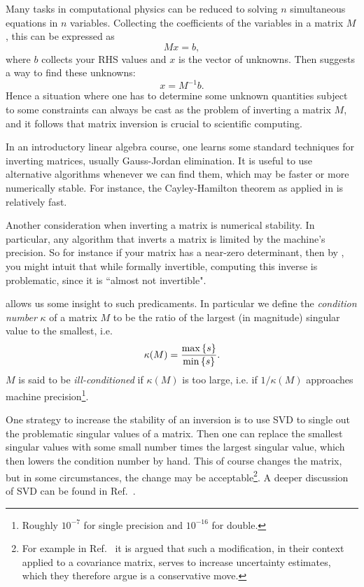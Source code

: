 Many tasks in computational physics can be reduced to solving
$n$ simultaneous equations in $n$ variables. Collecting
the coefficients of the variables in a matrix $M$, this
can be expressed as
\begin{equation}\label{eq:solveGeneral}
Mx=b,
\end{equation}
where $b$ collects your RHS values and $x$ is the vector
of unknowns. Then  suggests a way
to find these unknowns:
\begin{equation}
x=M^{-1}b.
\end{equation}
Hence a situation where one has to determine some unknown
quantities subject to some constraints can always be cast
as the problem of inverting a matrix $M$, and it follows that
matrix inversion is crucial to scientific computing.

In an introductory linear algebra course,
one learns some standard techniques for inverting matrices,
usually Gauss-Jordan elimination. 
It is useful to use alternative algorithms whenever we can find them,
which may be faster or more numerically stable.
For instance, the Cayley-Hamilton theorem as applied
in  is relatively fast.

Another consideration when inverting a matrix is numerical
stability. In particular, any algorithm that inverts a matrix is
limited by the machine's precision. So for instance if your
matrix has a near-zero determinant, then by
, you might intuit that while
formally invertible, computing this inverse is problematic,
since it is ``almost not invertible".

 allows us some insight to such predicaments.
In particular we define the {\it condition number}
$\kappa$ of a matrix $M$ to be the ratio of the largest
(in magnitude) singular value to the smallest, i.e.
\begin{equation}
\kappa(M)=\frac{\max\left\{s\right\}}{\min\left\{s\right\}}.
\end{equation}
$M$ is said to be {\it ill-conditioned}
if $\kappa(M)$ is too large, i.e. if $1/\kappa(M)$ approaches
machine precision\footnote{Roughly $10^{-7}$ for
single precision and $10^{-16}$ for double.}.

One strategy to increase the stability of an inversion is to use
SVD to single out the problematic singular values of a matrix.
Then one can replace the smallest singular values with some small
number times the largest singular value, which then lowers
the condition number by hand. This of course changes the matrix,
but in some circumstances, the change may be 
acceptable\footnote{For example in Ref.~\cite{dowdall_neutral_2019}
it is argued that such a modification, in their context applied
to a covariance matrix, serves to increase uncertainty estimates, which
they therefore argue is a conservative move.}.
A deeper discussion of SVD can be found in Ref.~\cite{press_numerical_2007}.


